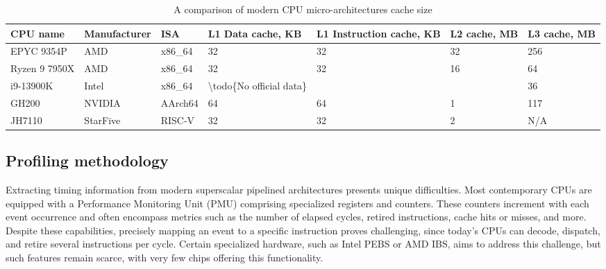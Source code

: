 \begin{table}[!t]
        \renewcommand{\arraystretch}{1.3}
        \caption{A comparison of modern CPU micro-architectures cache size}
        \centering
	\begin{tabular}{lllllll}
	        \hline
		CPU name      & Manufacturer & ISA     & L1 Data cache, KB                        & L1 Instruction cache, KB & L2 cache, MB & L3 cache, MB \\
		\hline
		EPYC 9354P    & AMD          & x86\_64 & 32                                       & 32                       & 32           & 256          \\
		Ryzen 9 7950X & AMD          & x86\_64 & 32                                       & 32                       & 16           & 64           \\
		i9-13900K     & Intel        & x86\_64 & \textbackslash{}todo\{No official data\} &                          &              & 36           \\
		GH200         & NVIDIA       & AArch64 & 64                                       & 64                       & 1            & 117          \\
		JH7110        & StarFive     & RISC-V  & 32                                       & 32                       & 2            & N/A
	\end{tabular}
        \label{tab:caches}
\end{table}

\subsection{Profiling methodology}

Extracting timing information from modern superscalar pipelined architectures presents unique difficulties. Most contemporary CPUs are equipped with a Performance Monitoring Unit (PMU) comprising specialized registers and counters. These counters increment with each event occurrence and often encompass metrics such as the number of elapsed cycles, retired instructions, cache hits or misses, and more. Despite these capabilities, precisely mapping an event to a specific instruction proves challenging, since today's CPUs can decode, dispatch, and retire several instructions per cycle. Certain specialized hardware, such as Intel PEBS or AMD IBS, aims to address this challenge, but such features remain scarce, with very few chips offering this functionality\cite{bakhvalovPerformanceAnalysisTuning2020}.

